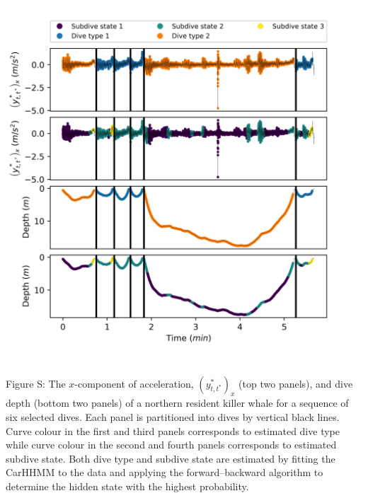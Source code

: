 \documentclass{article}
\begin{document}
        \begin{center}
        \includegraphics[width=6in]{../Plots/2019/20190902-182840-CATs_OB_1_0_267_CarHHMM1_decoded_dives.png}
        \end{center}
        
        \noindent Figure S: The $x$-component of acceleration, $(y^*_{t,t^*})_x$ (top two panels), and dive depth (bottom two panels) of a northern resident killer whale for a sequence of six selected dives. Each panel is partitioned into dives by vertical black lines. Curve colour in the first and third panels corresponds to estimated dive type while curve colour in the second and fourth panels corresponds to estimated subdive state. Both dive type and subdive state are estimated by fitting the CarHHMM to the data and applying the forward--backward algorithm to determine the hidden state with the highest probability.
        \addtocounter{fignum}{1}
        
\end{document}
